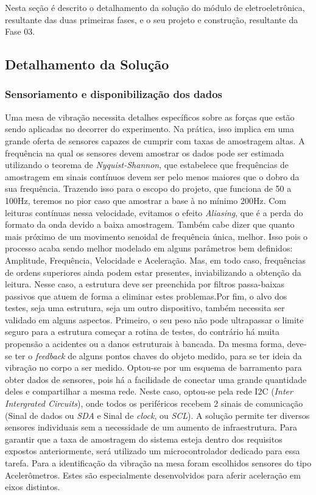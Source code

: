 \label{desenvolvimento_eletroeletronica}

Nesta seção é descrito o detalhamento da solução do módulo de eletroeletrônica, resultante das duas primeiras fases, 
e o seu projeto e construção, resultante da Fase 03.

\subsection{Detalhamento da Solução}

  \subsubsection*{\textbf{Sensoriamento e disponibilização dos dados}}
  Uma mesa de vibração necessita detalhes específicos sobre as forças que estão sendo aplicadas no decorrer do experimento. 
  Na prática, isso implica em uma grande oferta de sensores capazes de cumprir com taxas de amostragem altas. A frequência na 
  qual os sensores devem amostrar os dados pode ser estimada utilizando o teorema de \textit{Nyquist-Shannon}, que estabelece 
  que frequências de amostragem em sinais contínuos devem ser pelo menos maiores que o dobro da sua frequência. Trazendo isso 
  para o escopo do projeto, que funciona de 50 a 100Hz, teremos no pior caso que amostrar a base à no mínimo 200Hz. Com leituras
  contínuas nessa velocidade, evitamos o efeito \textit{Aliasing}, que é a perda do formato da onda devido a baixa amostragem.
  Também cabe dizer que quanto mais próximo de um movimento senoidal de frequência única, melhor. Isso pois o processo acaba sendo
  melhor modelado em alguns parâmetros bem definidos: Amplitude, Frequência, Velocidade e Aceleração. Mas, em todo caso, frequências 
  de ordens superiores ainda podem estar presentes, inviabilizando a obtenção da leitura. Nesse caso, a estrutura deve ser preenchida
  por filtros passa-baixas passivos que atuem de forma a eliminar estes problemas.Por fim, o alvo dos testes, seja uma estrutura, 
  seja um outro dispositivo, também necessita ser validado em alguns aspectos. Primeiro, o seu peso não pode ultrapassar o limite 
  seguro para a estrutura começar a rotina de testes, do contrário há muita propensão a acidentes ou a danos estruturais à bancada. 
  Da mesma forma, deve-se ter o \textit{feedback} de alguns pontos chaves do objeto medido, para se ter ideia da vibração no corpo a 
  ser medido.
Optou-se por um esquema de barramento para obter dados de sensores, pois há a facilidade de conectar uma 
grande quantidade deles e compartilhar a mesma rede. Neste caso, optou-se pela rede I2C (\textit{Inter Intergrated Circuits}),
onde todos os periféricos recebem 2 sinais de comunicação (Sinal de dados ou \textit{SDA} e Sinal de \textit{clock}, ou \textit{SCL}). A solução permite ter diversos sensores individuais sem a necessidade de um aumento de infraestrutura. Para garantir que a taxa de amostragem do sistema esteja dentro dos requisitos expostos anteriormente, será utilizado um microcontrolador dedicado para essa tarefa. Para a identificação da vibração na mesa foram escolhidos sensores do tipo Acelerômetros. Estes são especialmente desenvolvidos para aferir aceleração em eixos distintos.

